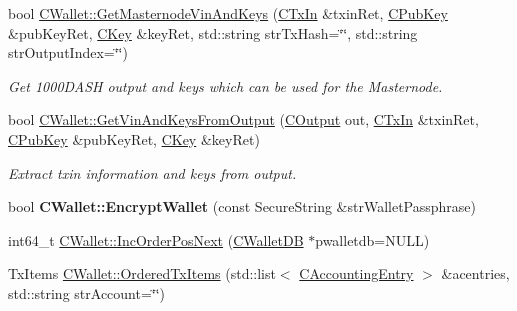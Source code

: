 \begin{DoxyCompactItemize}
\item 
\mbox{\label{group__map_wallet_ga4deb7baa65e036149f7d19b3aefe7323}} 
bool \mbox{\hyperlink{group__map_wallet_ga4deb7baa65e036149f7d19b3aefe7323}{C\+Wallet\+::\+Get\+Masternode\+Vin\+And\+Keys}} (\mbox{\hyperlink{class_c_tx_in}{C\+Tx\+In}} \&txin\+Ret, \mbox{\hyperlink{class_c_pub_key}{C\+Pub\+Key}} \&pub\+Key\+Ret, \mbox{\hyperlink{class_c_key}{C\+Key}} \&key\+Ret, std\+::string str\+Tx\+Hash=\char`\"{}\char`\"{}, std\+::string str\+Output\+Index=\char`\"{}\char`\"{})
\begin{DoxyCompactList}\small\item\em Get 1000D\+A\+SH output and keys which can be used for the Masternode. \end{DoxyCompactList}\item 
\mbox{\label{group__map_wallet_ga7621515b3195b8c8fb130c509725c9f2}} 
bool \mbox{\hyperlink{group__map_wallet_ga7621515b3195b8c8fb130c509725c9f2}{C\+Wallet\+::\+Get\+Vin\+And\+Keys\+From\+Output}} (\mbox{\hyperlink{class_c_output}{C\+Output}} out, \mbox{\hyperlink{class_c_tx_in}{C\+Tx\+In}} \&txin\+Ret, \mbox{\hyperlink{class_c_pub_key}{C\+Pub\+Key}} \&pub\+Key\+Ret, \mbox{\hyperlink{class_c_key}{C\+Key}} \&key\+Ret)
\begin{DoxyCompactList}\small\item\em Extract txin information and keys from output. \end{DoxyCompactList}\item 
\mbox{\label{group__map_wallet_gab34fe5bf771619dcbe22a65f013e5469}} 
bool {\bfseries C\+Wallet\+::\+Encrypt\+Wallet} (const Secure\+String \&str\+Wallet\+Passphrase)
\item 
int64\+\_\+t \mbox{\hyperlink{group__map_wallet_ga7a76d68661e6879651ac0b11f2893e58}{C\+Wallet\+::\+Inc\+Order\+Pos\+Next}} (\mbox{\hyperlink{class_c_wallet_d_b}{C\+Wallet\+DB}} $\ast$pwalletdb=N\+U\+LL)
\item 
Tx\+Items \mbox{\hyperlink{group__map_wallet_ga740572131004d77fbdb4617ec1aafb4a}{C\+Wallet\+::\+Ordered\+Tx\+Items}} (std\+::list$<$ \mbox{\hyperlink{class_c_accounting_entry}{C\+Accounting\+Entry}} $>$ \&acentries, std\+::string str\+Account=\char`\"{}\char`\"{})
\item 
\mbox{\label{group__map_wallet_ga26fd9a9f48230daf346500d2afb6115e}} 

\end{DoxyCompactItemize}
